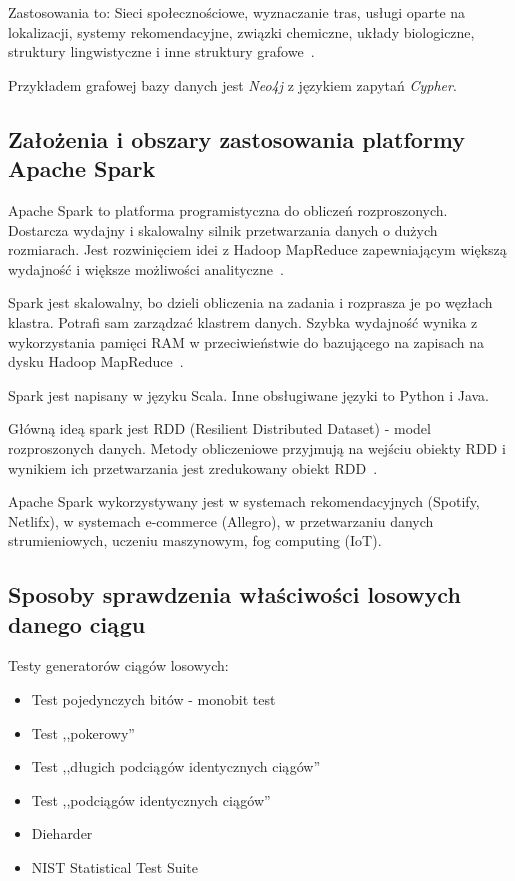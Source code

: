 \documentclass[wi]{zut}
\begin{document}
Zastosowania to: Sieci społecznościowe, wyznaczanie tras, usługi oparte na lokalizacji, systemy rekomendacyjne, związki chemiczne, układy biologiczne, struktury lingwistyczne i inne struktury grafowe~\cite{Jankowski2020_grafowe}.

Przykładem grafowej bazy danych jest \emph{Neo4j} z językiem zapytań \emph{Cypher}.

\subsection{Założenia i obszary zastosowania platformy Apache Spark}

Apache Spark to platforma programistyczna do obliczeń rozproszonych. Dostarcza wydajny i skalowalny silnik przetwarzania danych o dużych rozmiarach. Jest rozwinięciem idei z Hadoop MapReduce zapewniającym większą wydajność i większe możliwości analityczne~\cite{Malachowski_spark}.

Spark jest skalowalny, bo dzieli obliczenia na zadania i rozprasza je po węzłach klastra. Potrafi sam zarządzać klastrem danych. Szybka wydajność wynika z wykorzystania pamięci RAM w przeciwieństwie do bazującego na zapisach na dysku Hadoop MapReduce~\cite{Malachowski_spark}.

Spark jest napisany w języku Scala. Inne obsługiwane języki to Python i Java.

Główną ideą spark jest RDD (Resilient Distributed Dataset) - model rozproszonych danych. Metody obliczeniowe przyjmują na wejściu obiekty RDD i wynikiem ich przetwarzania jest zredukowany obiekt RDD~\cite{Malachowski_spark}.

Apache Spark wykorzystywany jest w systemach rekomendacyjnych (Spotify, Netlifx), w systemach e-commerce (Allegro), w przetwarzaniu danych strumieniowych, uczeniu maszynowym, fog computing (IoT).

\subsection{Sposoby sprawdzenia właściwości losowych danego ciągu}

Testy generatorów ciągów losowych:

\begin{itemize}
    \item Test pojedynczych bitów - monobit test
    \item Test ,,pokerowy''
    \item Test ,,długich podciągów identycznych ciągów''
    \item Test ,,podciągów identycznych ciągów''
    \item Dieharder
    \item NIST Statistical Test Suite \cite{Chocian2020_2}
\end{itemize}
\end{document}
